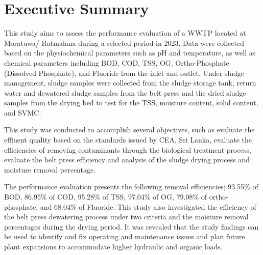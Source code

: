 \newpage
\section*{\centering Executive Summary}


This study aims to assess the performance evaluation of a \ac{WWTP} located at Moratuwa/ Ratmalana during a selected period in 2023. Data were collected based on the physiochemical parameters such as pH and temperature, as well as chemical parameters including \ac{BOD}, \ac{COD}, \ac{TSS}, \ac{OG}, Ortho-Phosphate (Dissolved Phosphate), and Fluoride from the inlet and outlet. Under sludge management, sludge samples were collected from the sludge storage tank, return water and dewatered sludge samples from the belt press and the dried sludge samples from the drying bed to test for the \ac{TSS}, moisture content, solid content, and \ac{SVMC}.

This study was conducted to accomplish several objectives, such as evaluate the effluent quality based on the standards issued by \ac{CEA}, Sri Lanka, evaluate the efficiencies of removing contaminants through the biological treatment process, evaluate the belt press efficiency and analysis of the sludge drying process and moisture removal percentage.

The performance evaluation presents the following removal efficiencies; 93.55\% of \ac{BOD}, 86.95\% of \ac{COD}, 95.28\% of \ac{TSS}, 97.04\% of \ac{OG}, 79.08\% of ortho-phosphate, and 68.04\% of Fluoride.  This study also investigated the efficiency of the belt press dewatering process under two criteria and the moisture removal percentages during the drying period.  It was revealed that the study findings can be used to identify and fix operating and maintenance issues and plan future plant expansions to accommodate higher hydraulic and organic loads.
